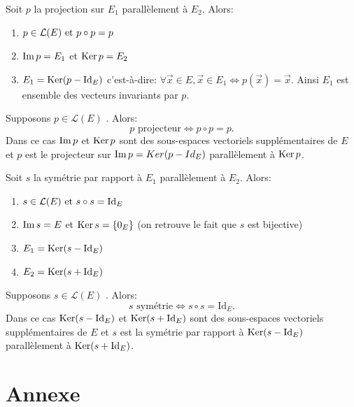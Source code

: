 \documentclass{book}
\begin{document}
\begin{Proposition}[Propriétés] Soit $p$ la projection sur $E_1$ parallèlement à $E_2$. Alors:
\begin{enumerate}
\item $p \in   \mathcal{L}(E)\text{ et }p \circ p = p$
\item $\operatorname{Im} p = E_1$ et $\operatorname{Ker} p = E_2$
\item $E_1 = \operatorname{Ker}(p - \mathrm{Id}_E)$ c'est-à-dire: $\forall   \vec{x} \in   E,\vec{ x }\in   E_1 \Leftrightarrow p(\vec{x}) = \vec{x}.$ Ainsi $E_1$ est ensemble des vecteurs invariants par $p$.
\end{enumerate}
\end{Proposition}
\begin{Proposition}[Caractérisation] Supposons $p \in   \mathcal{L}(E)$ . Alors:
$$p\text{ projecteur} \Leftrightarrow p \circ p = p.$$
Dans ce cas $\operatorname{Im} p$ et $\operatorname{Ker} p$ sont des sous-espaces vectoriels supplémentaires de $E$ et $p$ est le projecteur sur $\operatorname{Im} p =
Ker(p - Id_E)$ parallèlement à $\operatorname{Ker} p$.
\end{Proposition}
\begin{Proposition}[Propriétés] Soit $s$ la symétrie par rapport à $E_1$ parallèlement à $E_2$. Alors:
\begin{enumerate}
\item $s \in   \mathcal{L}(E)\text{ et }s \circ s = \mathrm{Id}_E$
\item $\operatorname{Im} s = E$ et $\operatorname{Ker} s = \{0_E\}$ (on retrouve le fait que $s$ est bijective)
\item $E_1 = \operatorname{Ker}(s - \mathrm{Id}_E)$
\item $E_2 = \operatorname{Ker}(s + \mathrm{Id}_E)$
\end{enumerate}
\end{Proposition}
\begin{Proposition}[Caractérisation] Supposons $s \in   \mathcal{L}(E)$ . Alors:
$$s\text{ symétrie} \Leftrightarrow s \circ s = \mathrm{Id}_E.$$
Dans ce cas $\operatorname{Ker}(s - \mathrm{Id}_E)$ et $\operatorname{Ker}(s + \mathrm{Id}_E)$ sont des sous-espaces vectoriels supplémentaires de $E$ et $s$ est la symétrie
par rapport à $\operatorname{Ker}(s - \mathrm{Id}_E)$ parallèlement à $\operatorname{Ker}(s + \mathrm{Id}_E)$.
\end{Proposition}





\section{Annexe}
\end{document}
